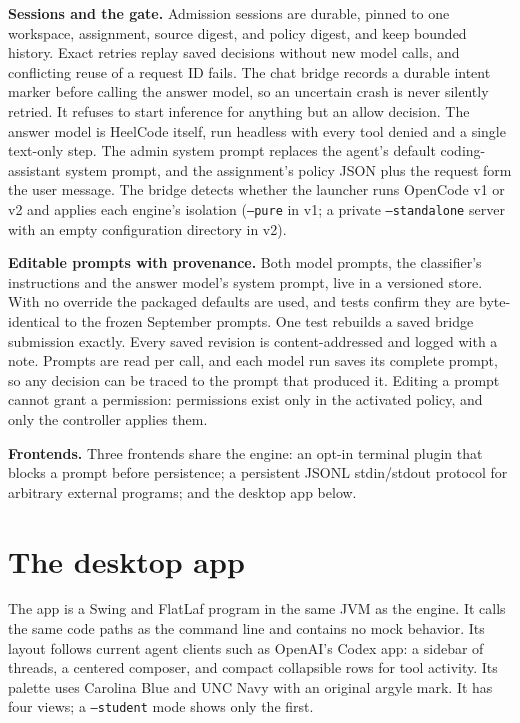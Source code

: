 \documentclass[11pt,letterpaper]{article}
\begin{document}
\textbf{Sessions and the gate.} Admission sessions are durable, pinned to one workspace, assignment, source digest, and policy digest, and keep bounded history. Exact retries replay saved decisions without new model calls, and conflicting reuse of a request ID fails. The chat bridge records a durable intent marker before calling the answer model, so an uncertain crash is never silently retried. It refuses to start inference for anything but an allow decision. The answer model is HeelCode itself, run headless with every tool denied and a single text-only step. The admin system prompt replaces the agent's default coding-assistant system prompt, and the assignment's policy JSON plus the request form the user message. The bridge detects whether the launcher runs OpenCode v1 or v2 and applies each engine's isolation (\texttt{--pure} in v1; a private \texttt{--standalone} server with an empty configuration directory in v2).

\textbf{Editable prompts with provenance.} Both model prompts, the classifier's instructions and the answer model's system prompt, live in a versioned store. With no override the packaged defaults are used, and tests confirm they are byte-identical to the frozen September prompts. One test rebuilds a saved bridge submission exactly. Every saved revision is content-addressed and logged with a note. Prompts are read per call, and each model run saves its complete prompt, so any decision can be traced to the prompt that produced it. Editing a prompt cannot grant a permission: permissions exist only in the activated policy, and only the controller applies them.

\textbf{Frontends.} Three frontends share the engine: an opt-in terminal plugin that blocks a prompt before persistence; a persistent JSONL stdin/stdout protocol for arbitrary external programs; and the desktop app below.

\section{The desktop app}\label{sec:app}

The app is a Swing and FlatLaf program in the same JVM as the engine. It calls the same code paths as the command line and contains no mock behavior. Its layout follows current agent clients such as OpenAI's Codex app: a sidebar of threads, a centered composer, and compact collapsible rows for tool activity. Its palette uses Carolina Blue and UNC Navy with an original argyle mark. It has four views; a \texttt{--student} mode shows only the first.
\end{document}
